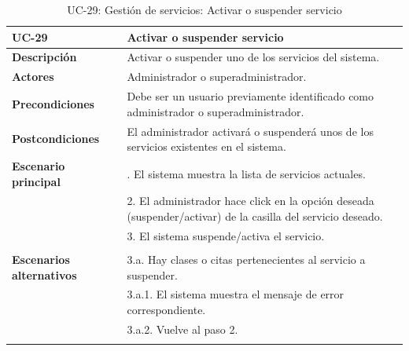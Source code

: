 \begin{table}[H]
  \begin{center}
    \begin{tabularx}{16.4cm}{|l|X|}
      \hline
      \textbf{UC-29} & \textbf{Activar o suspender servicio}\\
      \hline
      \textbf{Descripción} & Activar o suspender uno de los servicios del sistema.\\
      \hline
      \textbf{Actores} & Administrador o superadministrador.\\
      \hline
      \textbf{Precondiciones} & Debe ser un usuario previamente identificado como administrador o superadministrador.\\
      \hline
      \textbf{Postcondiciones} & El administrador activará o suspenderá unos de los servicios existentes en el sistema.\\
      \hline
      \textbf{Escenario principal} & \smallskip 1. El sistema muestra la lista de servicios actuales.\\
      & 2. El administrador hace click en la opción deseada (suspender/activar) de la casilla del servicio deseado.\\
      & 3. El sistema suspende/activa el servicio.\\
      & \\
      \hline
      \textbf{Escenarios alternativos} & \smallskip 3.a. Hay clases o citas pertenecientes al servicio a suspender.\\
      & \hspace{0.3cm} 3.a.1. El sistema muestra el mensaje de error correspondiente.\\
      & \hspace{0.3cm} 3.a.2. Vuelve al paso 2.\\      
      & \\
      \hline
    \end{tabularx}
    \caption{UC-29: Gestión de servicios: Activar o suspender servicio}
    \label{tab:CU-activar-suspender-servicio}
  \end{center}
\end{table}


